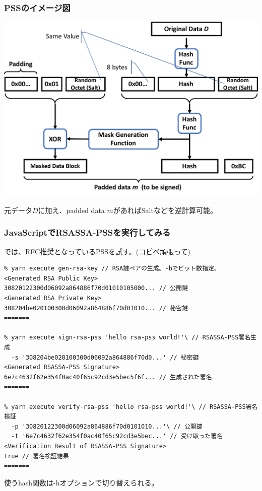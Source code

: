 \documentclass[12pt,dvipdfmx]{beamer}
\begin{document}
\begin{frame}
\frametitle{PSSのイメージ図}
\begin{center}
\includegraphics[width=0.8\linewidth]{Figs/pss.pdf}
\end{center}
元データ$D$に加え、padded data $m$があればSaltなどを逆計算可能。
\end{frame}


\begin{frame}[fragile]
\frametitle{JavaScriptでRSASSA-PSSを実行してみる}
では、RFC推奨となっているPSSを試す。(コピペ頑張って)
\begin{exampleblock}{}
\scriptsize
\begin{verbatim}
% yarn execute gen-rsa-key // RSA鍵ペアの生成。-bでビット数指定。
<Generated RSA Public Key>
30820122300d06092a864886f70d01010105000... // 公開鍵
<Generated RSA Private Key>
308204be020100300d06092a864886f70d01010... // 秘密鍵
=======

% yarn execute sign-rsa-pss 'hello rsa-pss world!'\ // RSASSA-PSS署名生成
  -s '308204be020100300d06092a864886f70d0...' // 秘密鍵
<Generated RSASSA-PSS Signature>
6e7c4632f62e354f0ac40f65c92cd3e5bec5f6f... // 生成された署名
=======

% yarn execute verify-rsa-pss 'hello rsa-pss world!'\ // RSASSA-PSS署名検証
  -p '30820122300d06092a864886f70d0101010...'\ // 公開鍵
  -t '6e7c4632f62e354f0ac40f65c92cd3e5bec...' // 受け取った署名
<Verification Result of RSASSA-PSS Signature>
true // 署名検証結果
=======
\end{verbatim}
\end{exampleblock}
使うhash関数は-hオプションで切り替えられる。

\end{frame}
\end{document}
